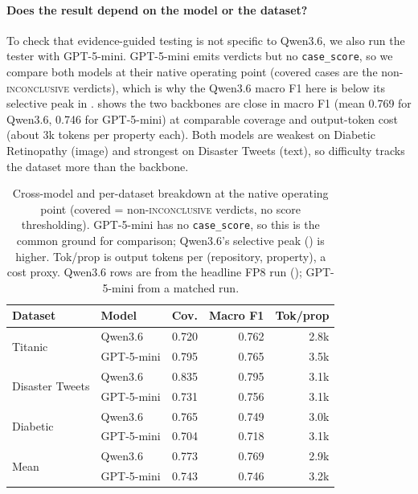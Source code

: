 \documentclass[11pt]{article}
\newcommand{\inconclusive}{\textsc{inconclusive}}
\newcommand{\qwen}{Qwen3.6}
\begin{document}
\paragraph{Does the result depend on the model or the dataset?}
To check that evidence-guided testing is not specific to \qwen{}, we also run
the tester with GPT-5-mini.
GPT-5-mini emits verdicts but no \texttt{case\_score}, so we compare both models
at their native operating point (covered cases are the non-\inconclusive{}
verdicts), which is why the \qwen{} macro F1 here is below its selective peak in
.
 shows the two backbones are close in macro F1 (mean 0.769 for
\qwen{}, 0.746 for GPT-5-mini) at comparable coverage and output-token cost
(about 3k tokens per property each).
Both models are weakest on Diabetic Retinopathy (image) and strongest on
Disaster Tweets (text), so difficulty tracks the dataset more than the backbone.

\begin{table}[t]
  \centering
  \small
  \begin{tabular}{llrrr}
    \toprule
    Dataset & Model & Cov. & Macro F1 & Tok/prop \\
    \midrule
    \multirow{2}{*}{Titanic} & \qwen{} & 0.720 & 0.762 & 2.8k \\
     & GPT-5-mini & 0.795 & 0.765 & 3.5k \\
    \midrule
    \multirow{2}{*}{Disaster Tweets} & \qwen{} & 0.835 & 0.795 & 3.1k \\
     & GPT-5-mini & 0.731 & 0.756 & 3.1k \\
    \midrule
    \multirow{2}{*}{Diabetic} & \qwen{} & 0.765 & 0.749 & 3.0k \\
     & GPT-5-mini & 0.704 & 0.718 & 3.1k \\
    \midrule
    \multirow{2}{*}{Mean} & \qwen{} & 0.773 & 0.769 & 2.9k \\
     & GPT-5-mini & 0.743 & 0.746 & 3.2k \\
    \bottomrule
  \end{tabular}
  \caption{Cross-model and per-dataset breakdown at the native operating point
  (covered = non-\inconclusive{} verdicts, no score thresholding). GPT-5-mini has
  no \texttt{case\_score}, so this is the common ground for comparison; \qwen{}'s
  selective peak () is higher. Tok/prop is output tokens per
  (repository, property), a cost proxy. \qwen{} rows are from the headline FP8
  run (); GPT-5-mini from a matched run.}
  \label{tab:models}
\end{table}
\end{document}
